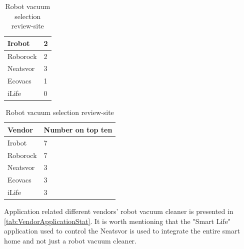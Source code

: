 \begin{table}[H]
\begin{subtable}[b]{0.45\linewidth}
\begin{tabular}{|l|l|}
            Irobot      & 2                 \\                   \hline
            Roborock    & 2                 \\                   \hline
            Neatsvor    & 3                 \\                   \hline
            Ecovacs     & 1                 \\                   \hline
            iLife       & 0                 \\                   \hline
        \end{tabular}
    \end{subtable}
    \hspace{0.5cm}
    \begin{subtable}[b]{0.45\linewidth}
        \centering
        \caption{Summary of all review-sites}
        \label{tab:RobotReviw2}
        \begin{tabular}{|l|l|}
            \hline
            \textbf{Vendor}    & \textbf{Number on top ten} \\ \hline
            Irobot      & 7                 \\                   \hline
            Roborock    & 7                 \\                   \hline
            Neatsvor    & 3                 \\                   \hline
            Ecovacs     & 3                 \\                   \hline
            iLife       & 3                 \\                   \hline
        \end{tabular}
    \end{subtable}
    \label{tab:RobotVacuumselcetionReviewSites}
    \caption{Robot vacuum selection review-site}
\end{table}

Application related different vendors' robot vacuum cleaner is presented in \ref{tab:VendorApplicationStat}. It is worth mentioning that the "Smart Life" application used to control the Neatsvor is used to integrate the entire smart home and not just a robot vacuum cleaner. 

